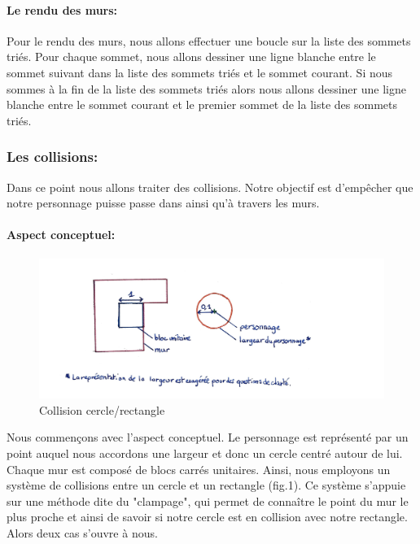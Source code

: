 \documentclass[12pt]{report}
\begin{document}
\paragraph{Le rendu des murs:}
Pour le rendu des murs, nous allons effectuer une boucle sur la liste des sommets triés. Pour chaque sommet, nous allons dessiner une ligne blanche entre le sommet suivant dans la liste des sommets triés et le sommet courant. Si nous sommes à la fin de la liste des sommets triés alors nous allons dessiner une ligne blanche entre le sommet courant et le premier sommet de la liste des sommets triés.

\subsubsection{Les collisions:}

Dans ce point nous allons traiter des collisions. Notre objectif est d'empêcher
que notre personnage puisse passe dans ainsi qu'à travers les murs.

\paragraph{Aspect conceptuel:}

\begin{figure}
	\centering
	\includegraphics[width=1\textwidth]{image/fig1.jpg}
	\caption{Collision cercle/rectangle}
	\label{fig:collision_cercle_rectangle}
\end{figure}

Nous commençons avec l'aspect conceptuel.
Le personnage est représenté par un point auquel nous accordons une 
largeur et donc un cercle centré autour de lui. Chaque mur est composé de 
blocs carrés unitaires. Ainsi, nous employons un système de collisions 
entre un cercle et un rectangle (fig.1). 
Ce système s'appuie sur une méthode dite du "clampage", qui permet de connaître le point du mur le plus proche 
et ainsi de savoir si notre cercle est en collision avec notre rectangle.
Alors deux cas s'ouvre à nous.
\end{document}
